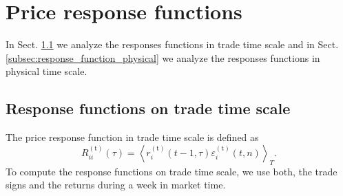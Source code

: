\section{Price response functions}\label{sec:response_functions}

In Sect. \ref{subsec:response_function_trade} we analyze the responses
functions in trade time scale and in Sect.
\ref{subsec:response_function_physical} we analyze the responses functions in
physical time scale.


\subsection{Response functions on trade time scale}
\label{subsec:response_function_trade}

The price response function in trade time scale is defined as
\cite{my_paper_response_financial}
\begin{equation}\label{eq:response_functions_trade_scale_general}
    R^{\left(\textrm{t}\right)}_{ii}\left(\tau\right)=\left\langle
    r^{\left(\textrm{t}\right)}_{i}\left(t-1,\tau \right)
    \varepsilon_{i}^{\left(\textrm{t}\right)}
    \left(t, n\right)\right\rangle _{T}.
\end{equation}
To compute the response functions on trade time scale, we use both, the trade
signs and the returns during a week in market time.

